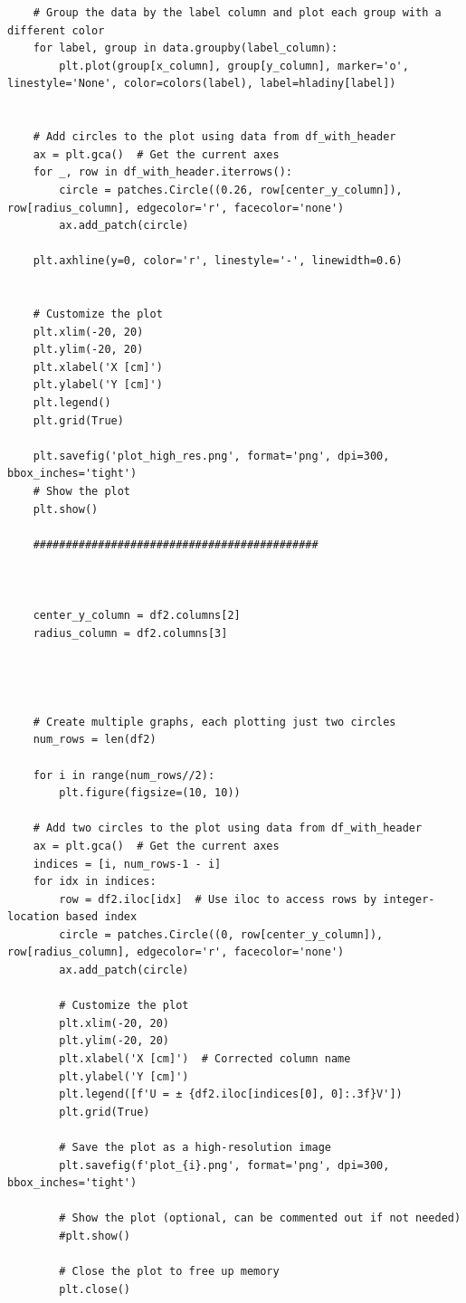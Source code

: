 \documentclass[czech,11pt,a4paper]{article}
\begin{document}
{\begin{verbatim}
	# Group the data by the label column and plot each group with a different color
	for label, group in data.groupby(label_column):
		plt.plot(group[x_column], group[y_column], marker='o', linestyle='None', color=colors(label), label=hladiny[label])
	
	
	# Add circles to the plot using data from df_with_header
	ax = plt.gca()  # Get the current axes
	for _, row in df_with_header.iterrows():
		circle = patches.Circle((0.26, row[center_y_column]), row[radius_column], edgecolor='r', facecolor='none')
		ax.add_patch(circle)
	
	plt.axhline(y=0, color='r', linestyle='-', linewidth=0.6)
	
	
	# Customize the plot
	plt.xlim(-20, 20)
	plt.ylim(-20, 20)
	plt.xlabel('X [cm]')  
	plt.ylabel('Y [cm]')  
	plt.legend()
	plt.grid(True)
	
	plt.savefig('plot_high_res.png', format='png', dpi=300, bbox_inches='tight')
	# Show the plot
	plt.show()
	
	############################################
	
	
	
	center_y_column = df2.columns[2]
	radius_column = df2.columns[3]
	
	
	
	
	# Create multiple graphs, each plotting just two circles
	num_rows = len(df2)
	
	for i in range(num_rows//2):
		plt.figure(figsize=(10, 10))
	
	# Add two circles to the plot using data from df_with_header
	ax = plt.gca()  # Get the current axes
	indices = [i, num_rows-1 - i]
	for idx in indices:
		row = df2.iloc[idx]  # Use iloc to access rows by integer-location based index
		circle = patches.Circle((0, row[center_y_column]), row[radius_column], edgecolor='r', facecolor='none')
		ax.add_patch(circle)
	
		# Customize the plot
		plt.xlim(-20, 20)
		plt.ylim(-20, 20)
		plt.xlabel('X [cm]')  # Corrected column name
		plt.ylabel('Y [cm]')  
		plt.legend([f'U = ± {df2.iloc[indices[0], 0]:.3f}V'])
		plt.grid(True)
	
		# Save the plot as a high-resolution image
		plt.savefig(f'plot_{i}.png', format='png', dpi=300, bbox_inches='tight')
	
		# Show the plot (optional, can be commented out if not needed)
		#plt.show()
	
		# Close the plot to free up memory
		plt.close()
	
	\end{verbatim}}

	
	

	
	
\end{document}
